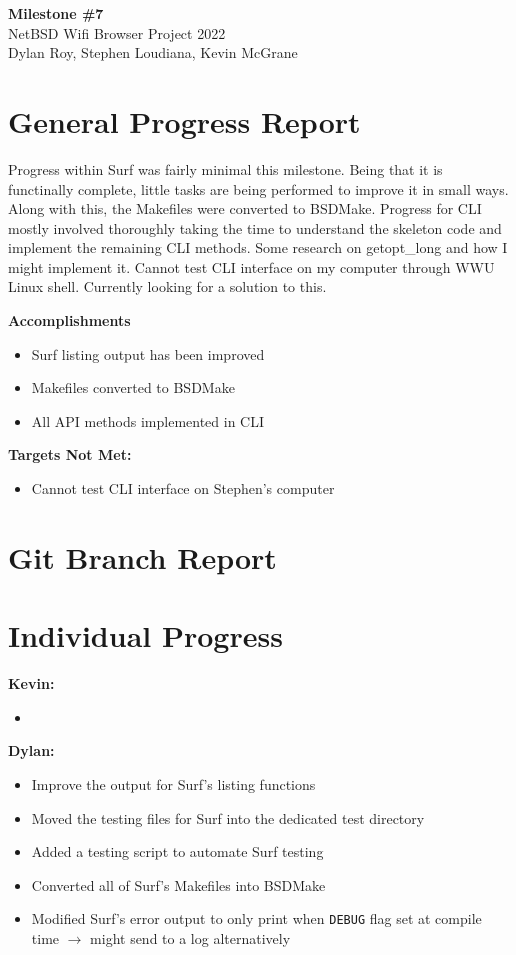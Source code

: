 \documentclass[11pt]{article}
\begin{document}
\begin{center}
  \textbf{\Large Milestone \#7}\\\large NetBSD Wifi Browser Project 2022\\
  Dylan Roy, Stephen Loudiana, Kevin McGrane
\end{center}

\section{General Progress Report}
Progress within Surf was fairly minimal this milestone. Being that it
is functinally complete, little tasks are being performed to improve
it in small ways. Along with this, the Makefiles were converted to BSDMake. 
Progress for CLI mostly involved thoroughly taking the time to understand 
the skeleton code and implement the remaining CLI methods. Some research on 
getopt_long and how I might implement it. Cannot test CLI interface on my 
computer through WWU Linux shell. Currently looking for a solution to this. 

\textbf{Accomplishments}
\begin{itemize}
  \item Surf listing output has been improved 
  \item Makefiles converted to BSDMake
  \item All API methods implemented in CLI 
\end{itemize}

\textbf{Targets Not Met:}
\begin{itemize}
  \item Cannot test CLI interface on Stephen's computer 
\end{itemize}


\section{Git Branch Report}

\newpage
\section{Individual Progress}

\textbf{Kevin:}
\begin{itemize}
  \item
\end{itemize}

\textbf{Dylan:}
\begin{itemize}
  \item Improve the output for Surf's listing functions
  \item Moved the testing files for Surf into the dedicated test directory
  \item Added a testing script to automate Surf testing
  \item Converted all of Surf's Makefiles into BSDMake
  \item Modified Surf's error output to only print when \texttt{DEBUG} flag set
    at compile time $\rightarrow$ might send to a log alternatively
\end{itemize}
\end{document}
